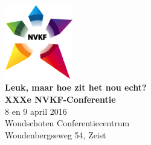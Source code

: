 \documentclass[a4paper,10pt]{report}
\begin{document}
\begin{multicols*}{3}
\strut\vfill
\noindent
\begin{center}
\includegraphics[width=3cm]{nvkf_logo}\\
{\bfseries Leuk, maar hoe zit het nou echt?}\\ \vspace{0.15cm} 
{\bfseries XXXe NVKF-Conferentie}\\ \vspace{0.15cm}
{8 en 9 april 2016}\\ \vspace{0.15cm}
{Woudschoten Conferentiecentrum}\\
{Woudenbergseweg 54, Zeist}
\end{center}
\vfill\strut

\columnbreak



\end{multicols*}
\end{document}
